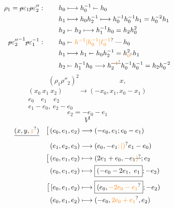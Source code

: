 \[
\begin{aligned}
\rho_1=\deleted{\rho}\varepsilon_1\deleted{\rho}\varepsilon''_2:\qquad
 h_0&\longmapsto h_0^{-1}\mathrel{\mapstochar\relbar}h_0\\
 h_1&\longmapsto h_0h_2^{-1}\longmapsto h_0^{-1}h_0^{-1}h_1=h_0^{-2}h_1\\
 h_2&\mathrel{\mapstochar\relbar}h_2\longmapsto h_1^{-1}h_0=h_2h_0^2\\
{\deleted{\rho}\varepsilon''_2}^{-1}\deleted{\rho}\varepsilon_1^{-1}:\qquad
 h_0&\mathrel{\mapstochar\relbar}\unsure{h^{-1}|h_0^{-1}|\ell_0^{-1}}\mathbin{\text{---}}h_0\\
 h_1&\longmapsto h_1\mathrel{\mapstochar\relbar}h_0h_2^{-1}=h_{\unsure{0}}^2h_1\\
 h_2&\mathrel{\mapstochar\relbar}h_1^{-1}h_0\longrightarrow h_2^{\deleted{\unsure{-1}}}h_0^{-1}h_0^{-1}=h_2h_0^{-2}
\end{aligned}
\]
\[
(\rho_1\rho''_2)^2\qquad\qquad\qquad x,
\]
\[
\begin{aligned}
(x_0\ x_1\ x_2)&\longrightarrow(-x_0,x_1,x_0-x_1)\\
 e_0\quad e_1\quad e_2&\\
 e_1-e_0,\ e_2-e_0&
\end{aligned}
\]
\[
e_2=-e_0-e_1
\]
\[
V^{\mathrm I}
\]
\[
\begin{aligned}
\deleted{(x,y,\unsure{z})}\quad\big[\, (e_0,e_1,e_2)&\longrightarrow(-e_0,e_1;e_0-e_1)\\
 (e_1,e_2,e_3)&\longrightarrow(e_0,-e_1\unsure{;|)}e_1-e_0)\\[2pt]
\big[\, (e_0,e_1,e_2)&\longmapsto(2e_1+e_0,-e_1\deleted{\unsure{)}};e_2\\
 (e_0,e_1,e_2)&\longmapsto\boxed{(-e_0-2e_1,\ e_1};-e_2)\\[2pt]
\big[\, [e_0,e_1,e_2)&\longmapsto\boxed{(e_0,\unsure{-2e_0-e_1}};-e_2)\\
 (e_0,e_1,e_2)&\longmapsto(-e_0,\unsure{2e_0+e_1},e_2)
\end{aligned}
\]

